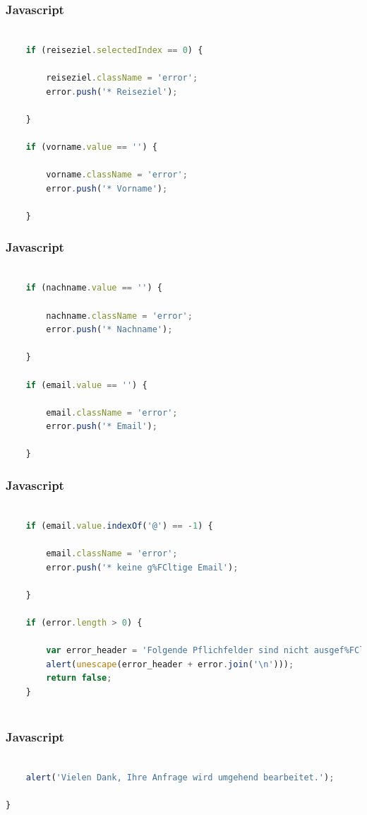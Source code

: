 \documentclass[xcolor=dvipsnames]{beamer}
\begin{document}
\begin{frame}[fragile]
\frametitle{Javascript}

\begin{lstlisting}[language=javascript, firstnumber=14]
	
	if (reiseziel.selectedIndex == 0) {

		reiseziel.className = 'error';
		error.push('* Reiseziel');

	}

	if (vorname.value == '') {

		vorname.className = 'error';
		error.push('* Vorname');

	}


\end{lstlisting}
\end{frame}

\begin{frame}[fragile]
\frametitle{Javascript}

\begin{lstlisting}[language=javascript, firstnumber=28]

	if (nachname.value == '') {

		nachname.className = 'error';
		error.push('* Nachname');

	}

	if (email.value == '') {

		email.className = 'error';
		error.push('* Email');

	}


\end{lstlisting}
\end{frame}

\begin{frame}[fragile]
\frametitle{Javascript}

\begin{lstlisting}[language=javascript, firstnumber=42]

	if (email.value.indexOf('@') == -1) {

		email.className = 'error';
		error.push('* keine g%FCltige Email');

	}

	if (error.length > 0) {

		var error_header = 'Folgende Pflichfelder sind nicht ausgef%FCllt:\n\n';
		alert(unescape(error_header + error.join('\n')));
		return false;
	}
	
\end{lstlisting}
\end{frame}

\begin{frame}[fragile]
\frametitle{Javascript}

\begin{lstlisting}[language=javascript, firstnumber=56]
	
	alert('Vielen Dank, Ihre Anfrage wird umgehend bearbeitet.');

}

\end{lstlisting}
\end{frame}
\end{document}
